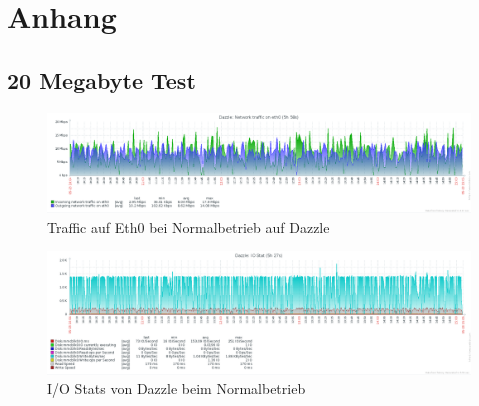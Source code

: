 \chapter{Anhang}
\label{cha:anhang}

\section{20 Megabyte Test}

\begin{figure}[htbp]
\centering
\includegraphics*[width=0.9\linewidth, angle=90]{Abb/ZabbixDazzle/Standard/DazzleStandard}

\caption{Traffic auf Eth0 bei Normalbetrieb auf Dazzle}
\label{fig:Eth0DazzleStandard}
\end{figure}


\begin{figure}[htbp]
\centering
\includegraphics*[width=0.9\linewidth, angle=90]{Abb/ZabbixDazzle/Standard/IoStatDazzleStandard}

\caption{I/O Stats von Dazzle beim Normalbetrieb}
\label{fig:IoStatDazzleStandard}
\end{figure} %


